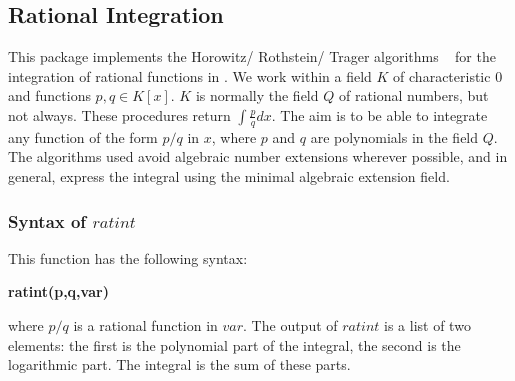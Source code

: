 
\subsection{Rational Integration}

This package implements the Horowitz/ Rothstein/ Trager algorithms ~\cite{Ged92} for the integration of rational functions in \REDUCE. We work within a field $K$ of characteristic $0$ and functions $p,q \in K[x]$. $K$ is normally the field $Q$ of rational numbers, but not always. These procedures return $\int \frac{p}{q} dx.$
 The aim is to be able to integrate any function of the form $p/q$ in $x$, where $p$ and $q$ are polynomials in the field $Q$. The algorithms used avoid algebraic number extensions wherever possible, and in general, express the integral using the minimal algebraic extension field. 

\subsubsection{Syntax of $ratint$}
This function has the following syntax:
\begin{center} \textbf{ratint(p,q,var)} \end{center}
where $ p/q$ is a rational function in $var$. The output of $ratint$ is a list of two elements: the first is the polynomial part of the integral, the second is the logarithmic part. The integral is the sum of these parts.
